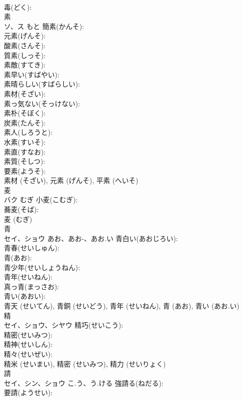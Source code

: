 \documentclass[8pt]{extreport}
\begin{document}
\begin{CJK}{UTF8}{min}
\\	毒(どく): 
\\	素			
\\	ソ、ス	もと	簡素(かんそ): 
\\	元素(げんそ): 
\\	酸素(さんそ): 
\\	質素(しっそ): 
\\	素敵(すてき): 
\\	素早い(すばやい): 
\\	素晴らしい(すばらしい): 
\\	素材(そざい): 
\\	素っ気ない(そっけない): 
\\	素朴(そぼく): 
\\	炭素(たんそ): 
\\	素人(しろうと): 
\\	水素(すいそ): 
\\	素直(すなお): 
\\	素質(そしつ): 
\\	要素(ようそ): 
\\	素材 (そざい), 元素 (げんそ), 平素 (へいそ)
\\	麦			
\\	バク	むぎ	小麦(こむぎ): 
\\	蕎麦(そば): 
\\	麦 (むぎ)
\\	青			
\\	セイ、ショウ	あお、あお-、あお.い	青白い(あおじろい): 
\\	青春(せいしゅん): 
\\	青(あお): 
\\	青少年(せいしょうねん): 
\\	青年(せいねん): 
\\	真っ青(まっさお): 
\\	青い(あおい): 
\\	青天 (せいてん), 青銅 (せいどう), 青年 (せいねん), 青 (あお), 青い (あお.い)
\\	精			
\\	セイ、ショウ、シヤウ		精巧(せいこう): 
\\	精密(せいみつ): 
\\	精神(せいしん): 
\\	精々(せいぜい): 
\\	精米 (せいまい), 精密 (せいみつ), 精力 (せいりょく)
\\	請			
\\	セイ、シン、ショウ	こ.う、う.ける	強請る(ねだる): 
\\	要請(ようせい): 

\end{CJK}
\end{document}
